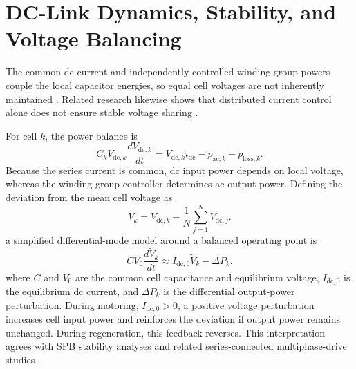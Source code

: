 \section{DC-Link Dynamics, Stability, and Voltage Balancing}
\label{sec:dclink_balancing}

The common dc current and independently controlled winding-group
powers couple the local capacitor
energies, so equal cell voltages are not inherently maintained
\cite{Nikouie2015Stability,Nikouie2017Stability}. Related research likewise shows that distributed current control
alone does not ensure stable voltage sharing \cite{Wang2015ThesisDVB}.

For cell $k$, the power balance is
\begin{equation}
C_kV_{\mathrm{dc},k}\frac{dV_{\mathrm{dc},k}}{dt}
=
V_{\mathrm{dc},k}i_{\mathrm{dc}}
-p_{\mathrm{ac},k}
-p_{\mathrm{loss},k}.
\label{eq:spb_voltage_dynamic}
\end{equation}
Because the series current is common, dc input power depends on local
voltage, whereas the winding-group controller determines ac output
power. Defining the deviation from the mean cell voltage as
\begin{equation}
\widetilde V_k=
V_{\mathrm{dc},k}
-\frac{1}{N}\sum_{j=1}^{N}V_{\mathrm{dc},j}.
\label{eq:cell_voltage_deviation}
\end{equation}
a simplified differential-mode model around a balanced operating point is
\begin{equation}
CV_0\frac{d\widetilde V_k}{dt}
\approx
I_{\mathrm{dc},0}\widetilde V_k-\Delta P_k.
\label{eq:linearized_balance_dynamic}
\end{equation}
where $C$ and $V_0$ are the common cell capacitance and equilibrium
voltage, $I_{\mathrm{dc},0}$ is the equilibrium dc current, and
$\Delta P_k$ is the differential output-power perturbation. During
motoring, $I_{\mathrm{dc},0}>0$, a positive voltage perturbation increases
cell input power and reinforces the deviation if output power remains
unchanged. During regeneration, this feedback reverses. This
interpretation agrees with SPB stability analyses
\cite{Nikouie2015Stability,Nikouie2017Stability} and related
series-connected multiphase-drive studies \cite{Ni2025SeriesDCLinkStability}.

